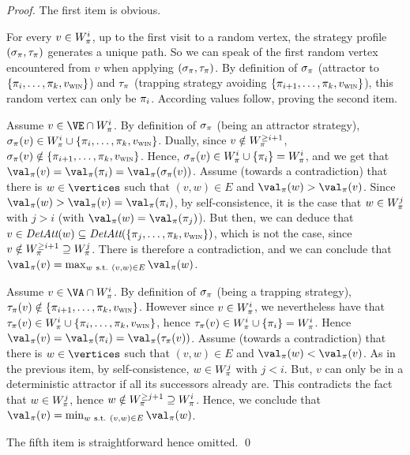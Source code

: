 \begin{proof}


  The first item is obvious.
  
  For every $v \in W_\pi^i$, up to the first visit to a random
  vertex, the strategy profile $(\sigma_\pi,\tau_\pi)$ generates a
  unique path. So we can speak of the first random vertex encountered
  from $v$ when applying $(\sigma_\pi,\tau_\pi)$. By definition of
  $\sigma_\pi$ (attractor to $\{\pi_i,\ldots,\pi_k,v_{\textsc{win}}\}$) and
  $\tau_\pi$ (trapping strategy avoiding
  $\{\pi_{i+1},\ldots,\pi_k,v_{\textsc{win}}\}$), this random vertex can only
  be $\pi_i$. According values follow, proving the second item.

  Assume $v \in \Evevertices \cap W_\perm^i$.  By definition of
  $\sigma_\pi$ (being an attractor strategy), $\sigma_\pi(v) \in
  W_\pi^i \cup \{\pi_i,\ldots,\pi_k,v_{\textsc{win}}\}$. Dually, since $v
  \notin W_\pi^{\ge i+1}$, $\sigma_\pi(v) \notin
  \{\pi_{i+1},\ldots,\pi_k,v_{\textsc{win}}\}$. Hence, $\sigma_\pi(v) \in
  W_\pi^i \cup \{\pi_i\} = W_\pi^i$, and we get that
  $\val_\perm(v) = \val_\perm(\perm_i) = \val_\perm(\sigma_\perm(v))$.
  Assume (towards a contradiction) that there is $w \in \vertices$
  such that $(v,w) \in E$ and $\val_\perm(w)>\val_\perm(v)$.  Since
  $\val_\perm(w) > \val_\perm(v) = \val_\perm(\perm_i)$, by
  self-consistence, it is the case that $w \in W_\pi^j$ with $j > i$
  (with $\val_\perm(w) = \val_\perm(\perm_j)$). But then, we can
  deduce that $v \in \textit{DetAtt}(w) \subseteq
  \textit{DetAtt}(\{\pi_j,\ldots,\pi_k,v_{\textsc{win}}\})$, which is not the case,
  since $v \notin W_\pi^{\ge i+1} \supseteq W_\pi^j$. There is
  therefore a contradiction, and we can conclude that $\val_\perm(v) =
  \max_{w\ \text{s.t.}\ (v,w) \in E} \val_\perm(w)$.


  Assume $v \in \Adamvertices \cap W_\perm^i$. By definition of
  $\sigma_\pi$ (being a trapping strategy), $\tau_\pi(v) \notin
  \{\pi_{i+1},\ldots,\pi_k,v_{\textsc{win}}\}$. However since $v \in
  W_\pi^i$, we nevertheless have that $\tau_\pi(v) \in W_\pi^i
  \cup \{\pi_i,\ldots,\pi_k,v_{\textsc{win}}\}$, hence $\tau_\pi(v) \in
  W_\pi^i \cup \{\pi_i\} = W_\pi^i$. Hence $\val_\perm(v) =
  \val_\perm(\perm_i) = \val_\perm(\tau_\perm(v))$.  Assume (towards a
  contradiction) that there is $w \in \vertices$ such that $(v,w) \in
  E$ and $\val_\perm(w)<\val_\perm(v)$. As in the previous item, by
  self-consistence, $w \in W_\pi^j$ with $j<i$. But, $v$ can only be
  in a deterministic attractor if all its successors already are. This
  contradicts the fact that $w \in W_\pi^j$, hence $w \notin
  W_\pi^{\ge j+1} \supseteq W_\pi^i$. Hence, we conclude that
  $\val_\perm(v) = \min_{w\ \text{s.t.}\ (v,w) \in E} \val_\perm(w)$.

  The fifth item is straightforward hence omitted.  \qed
\end{proof}

